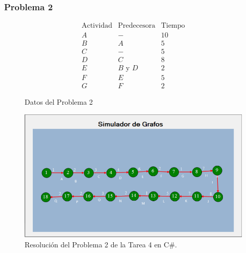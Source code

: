 \documentclass[a4paper, 12pt]{article}
\begin{document}
    \subsubsection{Problema 2}
    \begin{figure}[H]
        \[\begin{matrix}
            \text{Actividad}&\text{Predecesora}&\text{Tiempo}\\
            A&-&10\\
            B&A&5\\
            C&-&5\\
            D&C&8\\
            E&B\text{ y }D&2\\
            F&E&5\\
            G&F&2
        \end{matrix}\]
        \caption{Datos del Problema 2}
    \end{figure}
    \begin{figure}[H]
        \centering
        \includegraphics[width=12cm]{tarea4p2.PNG}
        \caption{Resolución del Problema 2 de la Tarea 4 en C\#.}
    \end{figure}
\end{document}
